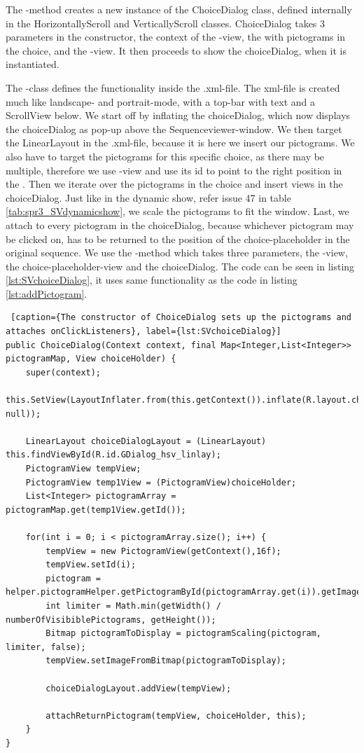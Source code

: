 The -method creates a new instance of the ChoiceDialog class, defined internally in the HorizontallyScroll and VerticallyScroll classes. ChoiceDialog takes 3 parameters in the constructor, the context of the -view, the  with pictograms in the choice, and the -view. It then proceeds to show the choiceDialog, when it is instantiated.

The -class defines the functionality inside the .xml-file. The xml-file is created much like landscape- and portrait-mode, with a top-bar with text and a ScrollView below. We start off by inflating the choiceDialog, which now displays the choiceDialog as pop-up above the Sequenceviewer-window. We then target the LinearLayout in the .xml-file, because it is here we insert our pictograms. We also have to target the pictograms for this specific choice, as there may be multiple, therefore we use -view and use its id to point to the right position in the . Then we iterate over the pictograms in the choice and insert views in the choiceDialog. Just like in the dynamic show, refer issue 47 in table \ref{tab:spr3_SVdynamicshow}, we scale the pictograms to fit the window. Last, we attach  to every pictogram in the choiceDialog, because whichever pictogram may be clicked on, has to be returned to the position of the choice-placeholder in the original sequence. We use the -method which takes three parameters, the -view, the choice-placeholder-view and the choiceDialog. The code can be seen in listing \ref{lst:SVchoiceDialog}, it uses same functionality as the code in listing \ref{lst:addPictogram}.

\begin{lstlisting} [caption={The constructor of ChoiceDialog sets up the pictograms and attaches onClickListeners}, label={lst:SVchoiceDialog}]
public ChoiceDialog(Context context, final Map<Integer,List<Integer>> pictogramMap, View choiceHolder) {
	super(context);
	this.SetView(LayoutInflater.from(this.getContext()).inflate(R.layout.choice_dialog, null));

	LinearLayout choiceDialogLayout = (LinearLayout) this.findViewById(R.id.GDialog_hsv_linlay);
	PictogramView tempView;
	PictogramView temp1View = (PictogramView)choiceHolder;
	List<Integer> pictogramArray = pictogramMap.get(temp1View.getId());

	for(int i = 0; i < pictogramArray.size(); i++) {
		tempView = new PictogramView(getContext(),16f);
		tempView.setId(i);
		pictogram = helper.pictogramHelper.getPictogramById(pictogramArray.get(i)).getImage();
		int limiter = Math.min(getWidth() / numberOfVisibiblePictograms, getHeight());
		Bitmap pictogramToDisplay = pictogramScaling(pictogram, limiter, false);
		tempView.setImageFromBitmap(pictogramToDisplay);

		choiceDialogLayout.addView(tempView);

		attachReturnPictogram(tempView, choiceHolder, this);
	}
}
\end{lstlisting}

